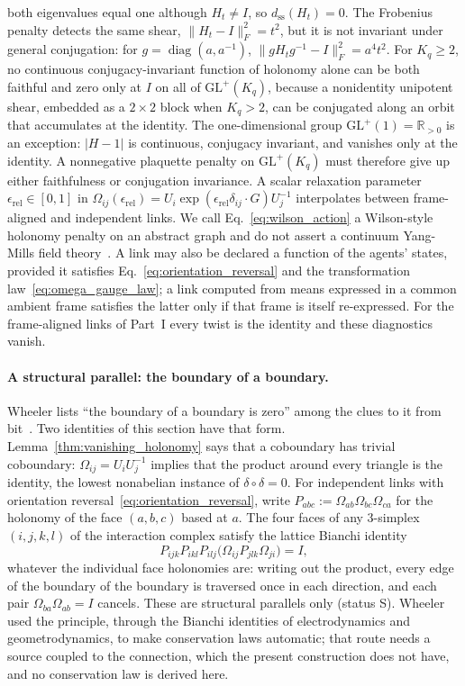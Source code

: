 \documentclass[11pt]{article}
\begin{document}
both eigenvalues equal one although $H_t\ne I$, so $d_{\mathrm{ss}}(H_t)=0$. The Frobenius penalty detects the same shear, $\|H_t-I\|_F^2=t^2$, but it is not invariant under general conjugation: for $g=\operatorname{diag}(a,a^{-1})$, $\|gH_tg^{-1}-I\|_F^2=a^4t^2$. For $K_q\geq2$, no continuous conjugacy-invariant function of holonomy alone can be both faithful and zero only at $I$ on all of $\mathrm{GL}^+(K_q)$, because a nonidentity unipotent shear, embedded as a $2\times2$ block when $K_q>2$, can be conjugated along an orbit that accumulates at the identity. The one-dimensional group $\mathrm{GL}^+(1)=\mathbb{R}_{>0}$ is an exception: $|H-1|$ is continuous, conjugacy invariant, and vanishes only at the identity. A nonnegative plaquette penalty on $\mathrm{GL}^+(K_q)$ must therefore give up either faithfulness or conjugation invariance. A scalar relaxation parameter $\epsilon_{\mathrm{rel}}\in[0,1]$ in $\Omega_{ij}(\epsilon_{\mathrm{rel}})=U_i\exp(\epsilon_{\mathrm{rel}}\delta_{ij}\cdot G)U_j^{-1}$ interpolates between frame-aligned and independent links. We call Eq.~\eqref{eq:wilson_action} a Wilson-style holonomy penalty on an abstract graph and do not assert a continuum Yang-Mills field theory~\cite{Yang1954}. A link may also be declared a function of the agents' states, provided it satisfies Eq.~\eqref{eq:orientation_reversal} and the transformation law~\eqref{eq:omega_gauge_law}; a link computed from means expressed in a common ambient frame satisfies the latter only if that frame is itself re-expressed. For the frame-aligned links of Part~I every twist is the identity and these diagnostics vanish.

\paragraph{A structural parallel: the boundary of a boundary.}
\label{sec:boundary_of_boundary}
Wheeler lists ``the boundary of a boundary is zero'' among the clues to it from bit~\cite{Wheeler1990}. Two identities of this section have that form. Lemma~\ref{thm:vanishing_holonomy} says that a coboundary has trivial coboundary: $\Omega_{ij} = U_iU_j^{-1}$ implies that the product around every triangle is the identity, the lowest nonabelian instance of $\delta\circ\delta = 0$. For independent links with orientation reversal~\eqref{eq:orientation_reversal}, write $P_{abc} := \Omega_{ab}\Omega_{bc}\Omega_{ca}$ for the holonomy of the face $(a,b,c)$ based at $a$. The four faces of any 3-simplex $(i,j,k,l)$ of the interaction complex satisfy the lattice Bianchi identity
\begin{equation}
P_{ijk} P_{ikl} P_{ilj} \big(\Omega_{ij} P_{jlk} \Omega_{ji}\big) = I,
\label{eq:lattice_bianchi}
\end{equation}
whatever the individual face holonomies are: writing out the product, every edge of the boundary of the boundary is traversed once in each direction, and each pair $\Omega_{ba}\Omega_{ab} = I$ cancels. These are structural parallels only (status S). Wheeler used the principle, through the Bianchi identities of electrodynamics and geometrodynamics, to make conservation laws automatic; that route needs a source coupled to the connection, which the present construction does not have, and no conservation law is derived here.
\end{document}
